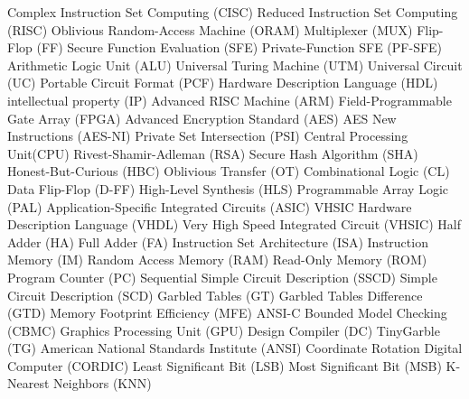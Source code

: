 \makeglossaries



Complex Instruction Set Computing (CISC)
Reduced Instruction Set Computing (RISC)
Oblivious Random-Access Machine (ORAM)
Multiplexer (MUX)
Flip-Flop (FF)
Secure Function Evaluation (SFE)
Private-Function SFE (PF-SFE)
Arithmetic Logic Unit (ALU)
Universal Turing Machine (UTM)
Universal Circuit (UC)
Portable Circuit Format (PCF)
Hardware Description Language (HDL)
intellectual property (IP)
Advanced RISC Machine (ARM)
Field-Programmable Gate Array (FPGA)
Advanced Encryption Standard (AES)
AES New Instructions (AES-NI)
Private Set Intersection (PSI)
Central Processing Unit(CPU)
Rivest-Shamir-Adleman (RSA)
Secure Hash Algorithm (SHA)
Honest-But-Curious (HBC)
Oblivious Transfer (OT)
Combinational Logic (CL)
Data Flip-Flop (D-FF)
High-Level Synthesis (HLS)
Programmable Array Logic (PAL)
Application-Specific Integrated Circuits (ASIC)
VHSIC Hardware Description Language (VHDL)
Very High Speed Integrated Circuit (VHSIC)
Half Adder (HA)
Full Adder (FA)
Instruction Set Architecture (ISA)
Instruction Memory (IM)
Random Access Memory (RAM)
Read-Only Memory (ROM)
Program Counter (PC)
Sequential Simple Circuit Description (SSCD)
Simple Circuit Description (SCD)
Garbled Tables (GT)
Garbled Tables Difference (GTD)
Memory Footprint Efficiency (MFE)
ANSI-C Bounded Model Checking (CBMC)
Graphics Processing Unit (GPU)
Design Compiler (DC)
TinyGarble (TG)
American National Standards Institute (ANSI)
Coordinate Rotation Digital Computer (CORDIC)
Least Significant Bit (LSB)
Most Significant Bit (MSB)
K-Nearest Neighbors (KNN)
